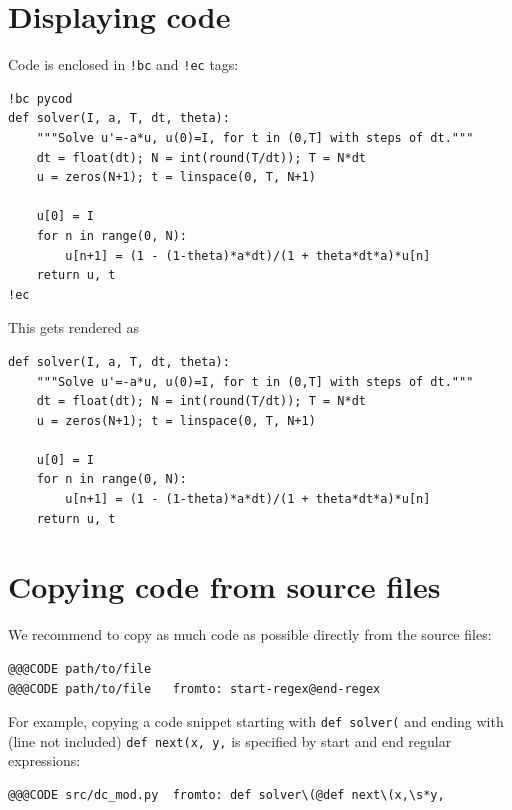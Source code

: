 \documentclass[%
twoside,                 %
final,                   %
chapterprefix=true,      %
open=right               %
10pt]{book}
\begin{document}
\section*{Displaying code}

Code is enclosed in \Verb~!bc~ and \Verb~!ec~ tags:

\begin{Verbatim}[numbers=none,fontsize=\fontsize{9pt}{9pt},baselinestretch=0.95]
!bc pycod
def solver(I, a, T, dt, theta):
    """Solve u'=-a*u, u(0)=I, for t in (0,T] with steps of dt."""
    dt = float(dt); N = int(round(T/dt)); T = N*dt
    u = zeros(N+1); t = linspace(0, T, N+1)

    u[0] = I
    for n in range(0, N):
        u[n+1] = (1 - (1-theta)*a*dt)/(1 + theta*dt*a)*u[n]
    return u, t
!ec
\end{Verbatim}
This gets rendered as

\begin{verbatim}
def solver(I, a, T, dt, theta):
    """Solve u'=-a*u, u(0)=I, for t in (0,T] with steps of dt."""
    dt = float(dt); N = int(round(T/dt)); T = N*dt
    u = zeros(N+1); t = linspace(0, T, N+1)

    u[0] = I
    for n in range(0, N):
        u[n+1] = (1 - (1-theta)*a*dt)/(1 + theta*dt*a)*u[n]
    return u, t
\end{verbatim}



\section*{Copying code from source files}

We recommend to copy as much code as possible directly from the
source files:

\begin{Verbatim}[numbers=none,fontsize=\fontsize{9pt}{9pt},baselinestretch=0.95]
@@@CODE path/to/file
@@@CODE path/to/file   fromto: start-regex@end-regex
\end{Verbatim}
For example, copying a code snippet starting with \Verb!def solver(! and
ending with (line not included) \Verb!def next(x, y,! is specified by
start and end regular expressions:

\begin{Verbatim}[numbers=none,fontsize=\fontsize{9pt}{9pt},baselinestretch=0.95]
@@@CODE src/dc_mod.py  fromto: def solver\(@def next\(x,\s*y,
\end{Verbatim}
\end{document}
